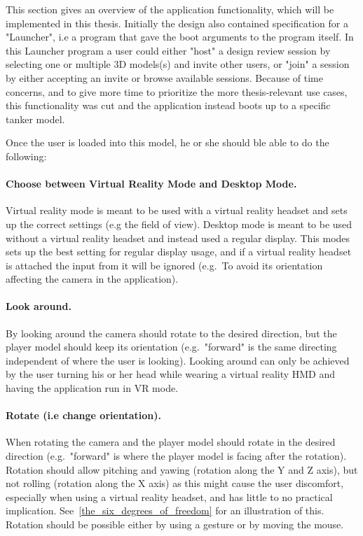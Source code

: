 
This section gives an overview of the application functionality, which will be implemented in this thesis.
Initially the design also contained specification for a "Launcher", i.e a program that gave the boot arguments to the program itself.
In this Launcher program a user could either "host" a design review session by selecting one or multiple 3D models(s) and invite other users, or
"join" a session by either accepting an invite or browse available sessions. Because of time concerns, and to give more time to prioritize the 
more thesis-relevant use cases, this functionality was cut and the application instead boots up to a specific tanker model. 

Once the user is loaded into this model, he or she should ble able to do the following:

\paragraph{Choose between Virtual Reality Mode and Desktop Mode.} Virtual reality mode is meant to be used with a virtual reality headset
and sets up the correct settings (e.g the field of view). Desktop mode is meant to be used without a virtual reality headset and instead used
a regular display. This modes sets up the best setting for regular display usage, and if a virtual reality headset is attached the input from it will be ignored 
(e.g.~To avoid its orientation affecting the camera in the application).

\paragraph{Look around.} By looking around the camera should rotate to the desired direction, but the player model should keep its orientation 
(e.g.~"forward" is the same directing independent of where the user is looking). Looking around can only be achieved by the user turning his or her 
head while wearing a virtual reality HMD and having the application run in VR mode.

\paragraph{Rotate (i.e change orientation).} When rotating the camera and the player model should rotate in the desired direction (e.g.~"forward" is where the player model is
facing after the rotation).
Rotation should allow pitching and yawing (rotation along the Y and Z axis), but not rolling (rotation along the X axis) as this might cause the user discomfort, especially when
using a virtual reality headset, and has little to no practical implication. See~\vref{the_six_degrees_of_freedom} for an illustration of this. 
Rotation should be possible either by using a gesture or by moving the mouse.

